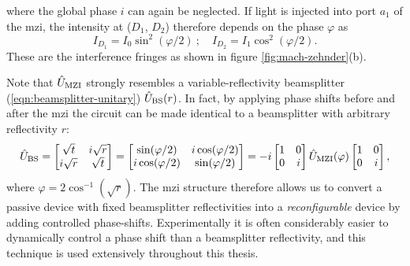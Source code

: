 where the global phase $i$ can again be neglected. If light is injected into port $a_1$ of the \gls{mzi}, the intensity at ($D_1$, $D_2$) therefore depends on the phase $\varphi$ as
\begin{equation}
    I_{D_1}=I_0\sin^2(\varphi/2)~;\quad
    I_{D_2}=I_1\cos^2(\varphi/2).
\end{equation}
These are the interference fringes as shown in figure \ref{fig:mach-zehnder}(b).

Note that $\hat{U}_{\mathrm{MZI}}$ strongly resembles a variable-reflectivity beamsplitter (\ref{eqn:beamsplitter-unitary}) $\hat{U}_\mathrm{BS}(r)$. In fact, by applying phase shifts before and after the \gls{mzi} the circuit can be made identical to a beamsplitter with arbitrary reflectivity $r$:
\begin{equation}
\hat{U}_\mathrm{BS} = 
    \begin{bmatrix}
        \sqrt{t} & i\sqrt{r} \\
        i\sqrt{r} & \sqrt{t}
    \end{bmatrix}
    =
    \begin{bmatrix}
        \sin(\varphi/2)    & i \cos(\varphi/2)\\
        i \cos(\varphi/2)  & \sin(\varphi/2)
    \end{bmatrix}
    =
    -i
    \begin{bmatrix} 1 & 0 \\ 0 & i \end{bmatrix}
    \hat{U}_{\mathrm{MZI}}(\varphi)
    \begin{bmatrix} 1 & 0 \\ 0 & i \end{bmatrix},
    \label{eqn:mzi-is-bs}
\end{equation}
where $\varphi = 2\cos^{-1}(\sqrt{r})$. 
%
The \gls{mzi} structure therefore allows us to convert a passive device with fixed beamsplitter reflectivities into a \emph{reconfigurable} device by adding controlled phase-shifts. Experimentally it is often considerably easier to dynamically control a phase shift than a beamsplitter reflectivity, and this technique is used extensively throughout this thesis.  

